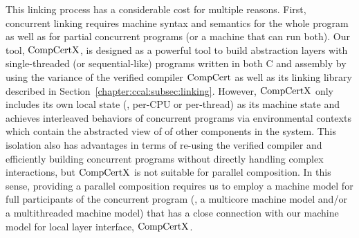 This linking process has a considerable cost for  multiple reasons.
First, concurrent linking requires machine syntax and semantics 
for the whole program as well as for partial concurrent programs (or a machine that can run both).
Our tool, $\mathrm{CompCertX}$, is designed as a 
powerful tool to build abstraction layers with single-threaded (or sequential-like) programs
written in both C and assembly by using the variance of the verified compiler $\mathrm{CompCert}$ as well as its linking library described in Section~\ref{chapter:ccal:subsec:linking}. 
However, $\mathrm{CompCertX}$ only includes its own local state (\ie, per-CPU or per-thread) as its machine state and achieves interleaved behaviors of concurrent programs via environmental contexts which contain the abstracted view of of other components in the system.
This isolation also has advantages in terms of re-using the verified compiler and efficiently  building  concurrent programs without directly handling complex interactions, but $\mathrm{CompCertX}$ is not 
suitable for parallel composition.
In this sense, providing a parallel  composition requires us to 
 employ a machine model for full participants of the concurrent program  (\ie, a multicore machine model and/or a multithreaded machine model)
 that has a close connection with our machine model for local layer interface, $\mathrm{CompCertX}$.
%
%


%


